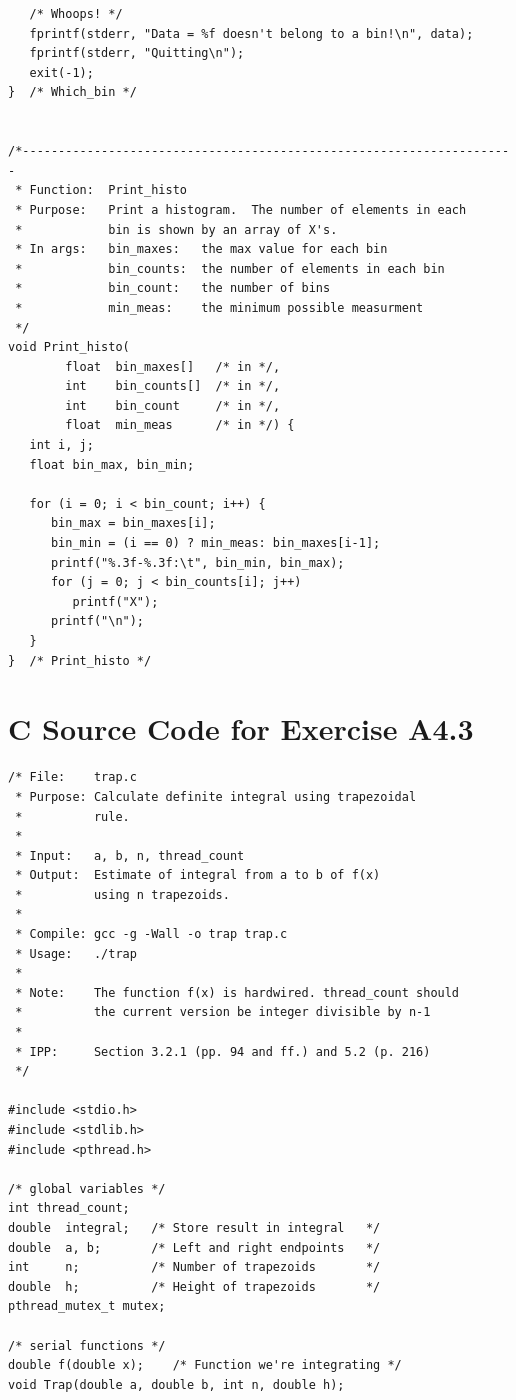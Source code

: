 \documentclass[a4paper,11pt,twoside]{article}
\begin{document}
{{\begin{verbatim}
   /* Whoops! */
   fprintf(stderr, "Data = %f doesn't belong to a bin!\n", data);
   fprintf(stderr, "Quitting\n");
   exit(-1);
}  /* Which_bin */


/*---------------------------------------------------------------------
 * Function:  Print_histo
 * Purpose:   Print a histogram.  The number of elements in each
 *            bin is shown by an array of X's.
 * In args:   bin_maxes:   the max value for each bin
 *            bin_counts:  the number of elements in each bin
 *            bin_count:   the number of bins
 *            min_meas:    the minimum possible measurment
 */
void Print_histo(
        float  bin_maxes[]   /* in */, 
        int    bin_counts[]  /* in */, 
        int    bin_count     /* in */, 
        float  min_meas      /* in */) {
   int i, j;
   float bin_max, bin_min;

   for (i = 0; i < bin_count; i++) {
      bin_max = bin_maxes[i];
      bin_min = (i == 0) ? min_meas: bin_maxes[i-1];
      printf("%.3f-%.3f:\t", bin_min, bin_max);
      for (j = 0; j < bin_counts[i]; j++)
         printf("X");
      printf("\n");
   }
}  /* Print_histo */

\end{verbatim}

\section{C Source Code for Exercise A4.3}{\label{app:sourceA4.3}
\begin{verbatim}
/* File:    trap.c
 * Purpose: Calculate definite integral using trapezoidal 
 *          rule.
 *
 * Input:   a, b, n, thread_count
 * Output:  Estimate of integral from a to b of f(x)
 *          using n trapezoids.
 *
 * Compile: gcc -g -Wall -o trap trap.c
 * Usage:   ./trap
 *
 * Note:    The function f(x) is hardwired. thread_count should 
 *          the current version be integer divisible by n-1 
 *
 * IPP:     Section 3.2.1 (pp. 94 and ff.) and 5.2 (p. 216)
 */

#include <stdio.h>
#include <stdlib.h>
#include <pthread.h>

/* global variables */
int thread_count;
double  integral;   /* Store result in integral   */
double  a, b;       /* Left and right endpoints   */
int     n;          /* Number of trapezoids       */
double  h;          /* Height of trapezoids       */
pthread_mutex_t mutex;

/* serial functions */
double f(double x);    /* Function we're integrating */
void Trap(double a, double b, int n, double h);


\end{verbatim}}}}
\end{document}
